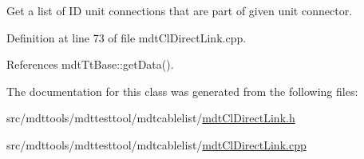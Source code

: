 Get a list of I\-D unit connections that are part of given unit connector. 



Definition at line 73 of file mdt\-Cl\-Direct\-Link.\-cpp.



References mdt\-Tt\-Base\-::get\-Data().



The documentation for this class was generated from the following files\-:\begin{DoxyCompactItemize}
\item 
src/mdttools/mdttesttool/mdtcablelist/\hyperlink{mdt_cl_direct_link_8h}{mdt\-Cl\-Direct\-Link.\-h}\item 
src/mdttools/mdttesttool/mdtcablelist/\hyperlink{mdt_cl_direct_link_8cpp}{mdt\-Cl\-Direct\-Link.\-cpp}\end{DoxyCompactItemize}
